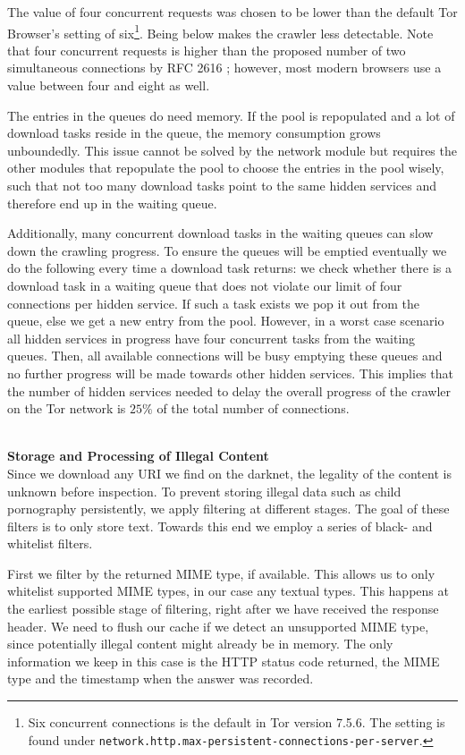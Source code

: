 \documentclass[USenglish,oneside,twocolumn]{article}
\newcommand{\sh}[1]{\noindent\vspace{0.5\baselineskip}\\ \textbf{#1}\\}
\begin{document}
The value of four concurrent requests was chosen to be lower than the default Tor Browser's setting of six\footnote{Six concurrent connections is the default in Tor version 7.5.6. The setting is found under \texttt{network.http.max-persistent-connections-per-server}.}. Being below makes the crawler less detectable. Note that four concurrent requests is higher than the proposed number of two simultaneous connections by RFC 2616 \cite{Nielsen1999}; however, most modern browsers use a value between four and eight as well.

The entries in the queues do need memory. If the pool is repopulated and a lot of download tasks reside in the queue, the memory consumption grows unboundedly. This issue cannot be solved by the network module but requires the other modules that repopulate the pool to choose the entries in the pool wisely, such that not too many download tasks point to the same hidden services and therefore end up in the waiting queue.

Additionally, many concurrent download tasks in the waiting queues can slow down the crawling progress.
To ensure the queues will be emptied eventually we do the following every time a download task returns: we
check whether there is a download task in a waiting queue that does not violate our limit of four connections per hidden service. If such a task exists we pop it out from the queue, else we get a new entry from the pool. However, in a worst case scenario all hidden services in progress have four concurrent tasks from the waiting queues. Then, all available connections will be busy emptying these queues and no further progress will be made towards other hidden services. This implies that the number of hidden services needed to delay the overall progress of the crawler on the Tor network is $25\%$ of the total number of connections.


\sh{Storage and Processing of Illegal Content}
Since we download any URI we find on the darknet, the legality of the content is unknown before inspection. To prevent storing illegal data such as child pornography persistently, we apply filtering at different stages. The goal of these filters is to only store text. Towards this end we employ a series of black- and whitelist filters.

First we filter by the returned MIME type, if available. This allows us to only whitelist supported MIME types, in our case any textual types. This happens at the earliest possible stage of filtering, right after we have received the response header. We need to flush our cache if we detect an unsupported MIME type, since potentially illegal content might already be in memory. The only information we keep in this case is the HTTP status code returned, the MIME type and the timestamp when the answer was recorded.
\end{document}
